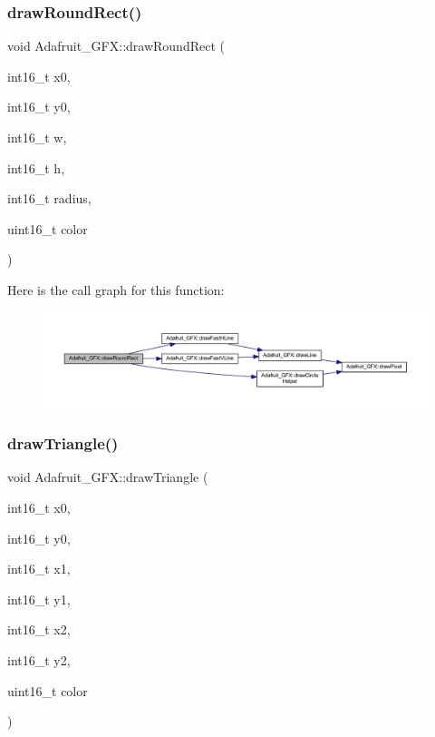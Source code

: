 \subsubsection{\texorpdfstring{draw\+Round\+Rect()}{drawRoundRect()}}
{\footnotesize\ttfamily void Adafruit\+\_\+\+G\+F\+X\+::draw\+Round\+Rect (\begin{DoxyParamCaption}\item[{int16\+\_\+t}]{x0,  }\item[{int16\+\_\+t}]{y0,  }\item[{int16\+\_\+t}]{w,  }\item[{int16\+\_\+t}]{h,  }\item[{int16\+\_\+t}]{radius,  }\item[{uint16\+\_\+t}]{color }\end{DoxyParamCaption})}

Here is the call graph for this function\+:
\nopagebreak
\begin{figure}[H]
\begin{center}
\leavevmode
\includegraphics[width=350pt]{d9/d97/class_adafruit___g_f_x_ab496b247abec724ef80e17a30257972b_cgraph}
\end{center}
\end{figure}
\mbox{\label{class_adafruit___g_f_x_a49284b9cea16ecf8c15dfd0b51a841e6}} 
\subsubsection{\texorpdfstring{draw\+Triangle()}{drawTriangle()}}
{\footnotesize\ttfamily void Adafruit\+\_\+\+G\+F\+X\+::draw\+Triangle (\begin{DoxyParamCaption}\item[{int16\+\_\+t}]{x0,  }\item[{int16\+\_\+t}]{y0,  }\item[{int16\+\_\+t}]{x1,  }\item[{int16\+\_\+t}]{y1,  }\item[{int16\+\_\+t}]{x2,  }\item[{int16\+\_\+t}]{y2,  }\item[{uint16\+\_\+t}]{color }\end{DoxyParamCaption})}

